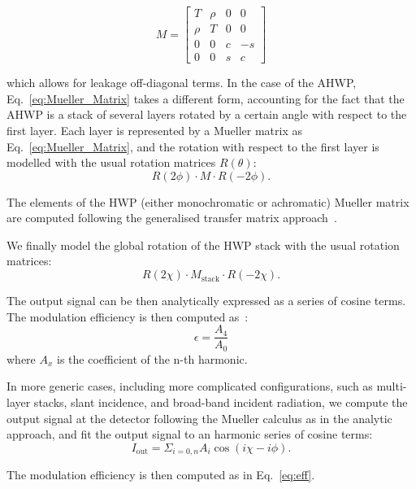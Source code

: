 \begin{equation}
M=\begin{bmatrix}
   T  &\rho  &0  &0\\
   \rho  &T  &0  &0\\
   0  &0  &c  &-s\\
   0  &0  &s  &c
\end{bmatrix}
\label{eq:Mueller_Matrix}
\end{equation}

which allows for leakage off-diagonal terms. In the case of the AHWP, Eq.~\ref{eq:Mueller_Matrix} takes a different form, accounting for the fact that the AHWP is a stack of several layers rotated by a certain angle with respect to the first layer. Each layer is represented by a Mueller matrix as Eq.~\ref{eq:Mueller_Matrix}, and the rotation with respect to the first layer is modelled with the usual rotation matrices $R(\theta)$:
\begin{equation}
R{(2\phi)}\cdot M \cdot R(-2\phi).
\end{equation} 

The elements of the HWP (either monochromatic or achromatic) Mueller matrix are computed following the generalised transfer matrix approach~\cite{Essinger-Hileman_TM}. 

We finally model the global rotation of the HWP stack with the usual rotation matrices:
\begin{equation}
R{(2\chi)}\cdot M_\mathrm{stack} \cdot R(-2\chi).
\end{equation}

The output signal can be then analytically expressed as a series of cosine terms. The modulation efficiency is then computed as~\cite{Hanany:2005vx,Matsumura:2008zx}:
\begin{equation}\label{eq:eff}
\epsilon=\frac{A_4}{A_0}
\end{equation}
where $A_x$ is the coefficient of the n-th harmonic.

In more generic cases, including more complicated configurations, such as multi-layer stacks, slant incidence, and broad-band incident radiation, we compute the output signal at the detector following the Mueller calculus as in the analytic approach, and fit the output signal to an harmonic series of cosine terms:
\begin{equation}
I_\mathrm{out}=\Sigma_{i=0,n} A_i \cos(i\chi-i\phi).
\end{equation}

The modulation efficiency is then computed as in Eq.~\ref{eq:eff}. %

